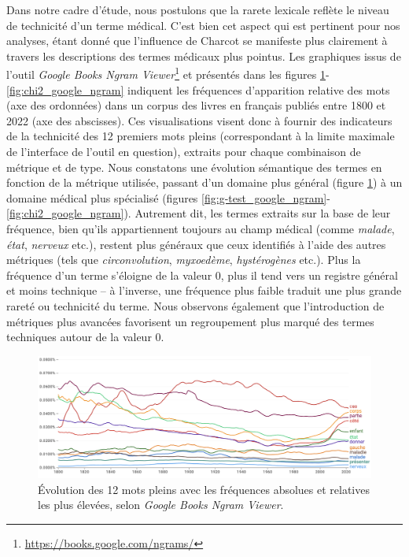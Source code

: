 Dans notre cadre d'étude, nous postulons que la rarete lexicale reflète le niveau de technicité d'un terme médical. C'est bien cet aspect qui est pertinent pour nos analyses, étant donné que l'influence de Charcot se manifeste plus clairement à travers les descriptions des termes médicaux plus pointus. Les graphiques issus de l'outil \textit{Google Books Ngram Viewer}\footnote{\url{https://books.google.com/ngrams/}} et présentés dans les figures \ref{fig:freq_ngram}-\ref{fig:chi2_google_ngram} indiquent les fréquences d'apparition relative des mots (axe des ordonnées) dans un corpus des livres en français publiés entre 1800 et 2022 (axe des abscisses). Ces visualisations visent donc à fournir des indicateurs de la technicité des 12 premiers mots pleins (correspondant à la limite maximale de l'interface de l'outil en question), extraits pour chaque combinaison de métrique et de type. Nous constatons une évolution sémantique des termes en fonction de la métrique utilisée, passant d'un domaine plus général (figure \ref{fig:freq_ngram}) à un domaine médical plus spécialisé (figures \ref{fig:g-test_google_ngram}-\ref{fig:chi2_google_ngram}). Autrement dit, les termes extraits sur la base de leur fréquence, bien qu'ils appartiennent toujours au champ médical (comme \textit{malade}, \textit{état}, \textit{nerveux} etc.), restent plus généraux que ceux identifiés à l'aide des autres métriques (tels que \textit{circonvolution}, \textit{myxoedème}, \textit{hystérogènes} etc.). Plus la fréquence d'un terme s'éloigne de la valeur 0, plus il tend vers un registre général et moins technique -- à l'inverse, une fréquence plus faible traduit une plus grande rareté ou technicité du terme. Nous observons également que l'introduction de métriques plus avancées favorisent un regroupement plus marqué des termes techniques autour de la valeur 0.

\begin{figure}[h]
	\centering
	\includegraphics[width=1\textwidth]{img/frequences_gngram.png}
	\caption{Évolution des 12 mots pleins avec les fréquences absolues et relatives les plus élevées, selon \textit{Google Books Ngram Viewer}.}
	\label{fig:freq_ngram}
\end{figure}

